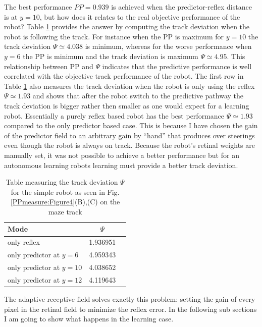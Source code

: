 The best performance $PP=0.939$ is achieved when the predictor-reflex distance is 
at $y=10$, but how does it relates to the real objective performance of the robot?
Table \ref{table:PPmeausure:TableSimpleTrack} provides the answer by computing the
track deviation when the robot is following the track.
For instance when the PP is maximum for $y=10$ the track deviation $\Psi\simeq4.038$
is minimum, whereas for the worse performance when $y=6$ the PP is minimum and 
the track deviation is maximum $\Psi\simeq4.95$.
This relationship between PP and $\Psi$ indicates that the predictive performance
is well correlated with the objective track performance of the robot.
The first row in Table \ref{table:PPmeausure:TableSimpleTrack} also measures
the track deviation when the robot is only using the reflex $\Psi\simeq 1.93$ and 
shows that after the robot switch to the predictive pathway the track deviation 
is bigger rather then smaller as one would expect for a learning robot.
Essentially a purely reflex 
based robot has the best performance $\Psi \simeq 1.93$ compared to the only predictor based case. 
This is because I have chosen the gain of the predictor field to an arbitrary gain
by ``hand'' that produces over steerings even though the robot is always on track.
Because the robot's retinal weights are manually set, it was not possible to 
achieve a better performance but for an autonomous learning robots 
learning must provide a better track deviation.

\begin{table}[htbp]
\caption[Track deviation values for simple robot]{Table measuring the track deviation $\Psi$ for the simple robot 
as seen in Fig.\ref{PPmeasure:Figure4}(B),(C) on the maze track}
\label{table:PPmeausure:TableSimpleTrack}
\begin{center}
  \begin{tabular}{| l | c | c |}
    \hline
     Mode & $\Psi$ \\ \hline
     only reflex & 1.936951 \\ \hline
     only predictor at $y=6$  & 4.959343\\ \hline
     only predictor at $y=10$ & 4.038652\\ \hline
     only predictor at $y=12$ & 4.119643\\ \hline
  \end{tabular}
\end{center}
\end{table}

The adaptive receptive field solves exactly this problem: setting the gain of every
pixel in the retinal field to minimize the reflex error.
In the following sub sections I am going to show what happens in the learning case.

